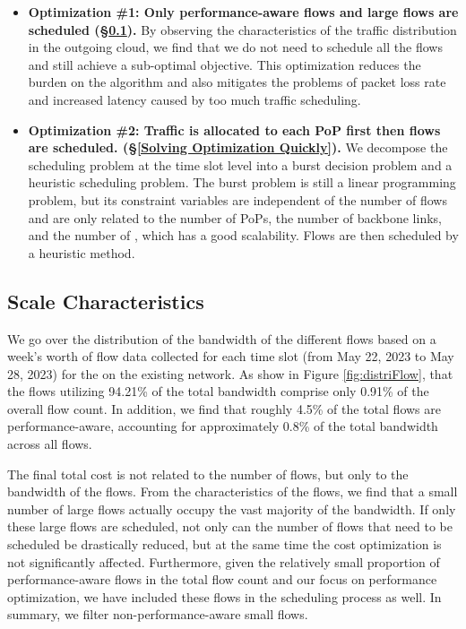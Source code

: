 \begin{itemize}[leftmargin=*]  
\item \textbf{Optimization \#1: Only performance-aware flows and large flows are scheduled (\S\ref{Scale Characteristics}).} By observing the characteristics of the traffic distribution in the outgoing cloud, we find that we do not need to schedule all the flows and still achieve a sub-optimal objective. This optimization reduces the burden on the algorithm and also mitigates the problems of packet loss rate and increased latency caused by too much traffic scheduling. 
\item \textbf{Optimization \#2: Traffic is allocated to each PoP first then flows are scheduled. (\S\ref{Solving Optimization Quickly}).} We decompose the scheduling problem at the time slot level into a burst decision problem and a heuristic scheduling problem. The burst problem is still a linear programming problem, but its constraint variables are independent of the number of flows and are only related to the number of PoPs, the number of backbone links, and the number of {\egresses}, which has a good scalability. Flows are then scheduled by a heuristic method.
\end{itemize}

\subsection{Scale Characteristics} \label{Scale Characteristics}


We go over the distribution of the bandwidth of the different flows based on a week's worth of flow data collected for each time slot (from May 22, 2023 to May 28, 2023) for the {\egresses} on the existing network. As show in Figure \ref{fig:distriFlow}, that the flows utilizing 94.21\% of the total bandwidth comprise only 0.91\% of the overall flow count. In addition, we find that roughly 4.5\% of the total flows are performance-aware, accounting for approximately 0.8\% of the total bandwidth across all flows. 

 The final total cost is not related to the number of flows, but only to the bandwidth of the flows. From the characteristics of the flows, we find that a small number of large flows actually occupy the vast majority of the bandwidth. If only these large flows are scheduled, not only can the number of flows that need to be scheduled be drastically reduced, but at the same time the cost optimization is not significantly affected. Furthermore, given the relatively small proportion of performance-aware flows in the total flow count and our focus on performance optimization, we have included these flows in the scheduling process as well. In summary, we filter non-performance-aware small flows.

